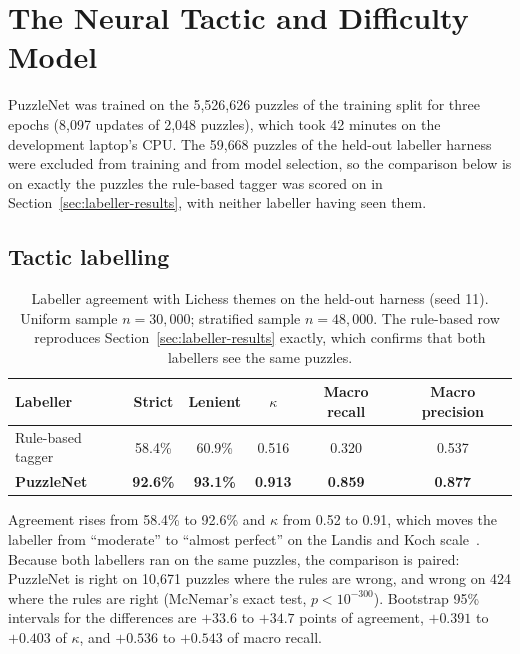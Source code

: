 \section{The Neural Tactic and Difficulty Model}\label{sec:nn-results}

PuzzleNet was trained on the 5{,}526{,}626 puzzles of the training split for three epochs (8{,}097
updates of 2{,}048 puzzles), which took 42 minutes on the development laptop's CPU. The 59{,}668
puzzles of the held-out labeller harness were excluded from training and from model selection, so the
comparison below is on exactly the puzzles the rule-based tagger was scored on in
Section~\ref{sec:labeller-results}, with neither labeller having seen them.

\subsection{Tactic labelling}\label{sec:nn-labelling}

\begin{table}[H]
\centering
\small
\caption{Labeller agreement with Lichess themes on the held-out harness (seed 11). Uniform sample
$n = 30{,}000$; stratified sample $n = 48{,}000$. The rule-based row reproduces
Section~\ref{sec:labeller-results} exactly, which confirms that both labellers see the same
puzzles.}\label{tab:nn-harness}
\begin{tabularx}{\linewidth}{Xccccc}
\toprule
\textbf{Labeller} & \textbf{Strict} & \textbf{Lenient} & \textbf{$\kappa$} & \textbf{Macro recall} & \textbf{Macro precision} \\
\midrule
Rule-based tagger & 58.4\% & 60.9\% & 0.516 & 0.320 & 0.537 \\
\textbf{PuzzleNet} & \textbf{92.6\%} & \textbf{93.1\%} & \textbf{0.913} & \textbf{0.859} & \textbf{0.877} \\
\bottomrule
\end{tabularx}
\end{table}

\begin{finding}
Agreement rises from 58.4\% to 92.6\% and $\kappa$ from 0.52 to 0.91, which moves the labeller from
``moderate'' to ``almost perfect'' on the Landis and Koch scale~\cite{landis1977measurement}. Because
both labellers ran on the same puzzles, the comparison is paired: PuzzleNet is right on 10{,}671
puzzles where the rules are wrong, and wrong on 424 where the rules are right (McNemar's exact test,
$p < 10^{-300}$). Bootstrap 95\% intervals for the differences are $+33.6$ to $+34.7$ points of
agreement, $+0.391$ to $+0.403$ of $\kappa$, and $+0.536$ to $+0.543$ of macro recall.
\end{finding}

